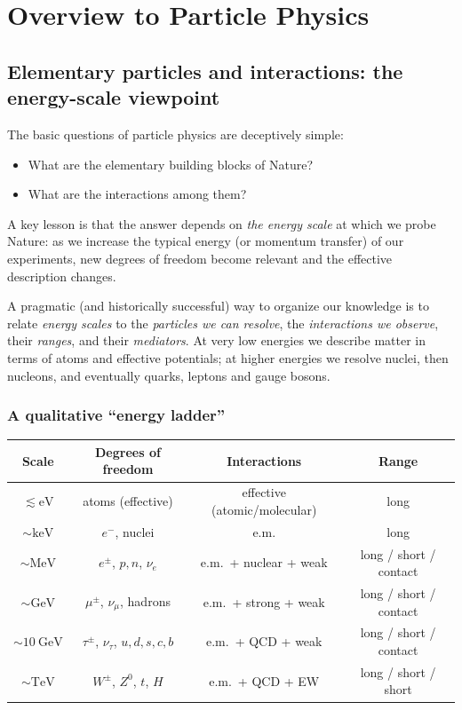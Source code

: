 \chapter{Overview to Particle Physics}

\section{Elementary particles and interactions: the energy-scale viewpoint}
The basic questions of particle physics are deceptively simple:
\begin{itemize}
  \item What are the elementary building blocks of Nature?
  \item What are the interactions among them?
\end{itemize}
A key lesson is that the answer depends on \emph{the energy scale} at which we probe Nature:
as we increase the typical energy (or momentum transfer) of our experiments, new degrees of
freedom become relevant and the effective description changes.

A pragmatic (and historically successful) way to organize our knowledge is to relate
\emph{energy scales} to the \emph{particles we can resolve}, the \emph{interactions we observe},
their \emph{ranges}, and their \emph{mediators}. At very low energies we describe matter in terms
of atoms and effective potentials; at higher energies we resolve nuclei, then nucleons,
and eventually quarks, leptons and gauge bosons.

\subsection{A qualitative ``energy ladder''}
\begin{center}
\small
\setlength{\tabcolsep}{8pt}
\renewcommand{\arraystretch}{1.15}
\begin{tabular}{@{}c c c c@{}}
\toprule
\textbf{Scale} & \textbf{Degrees of freedom} & \textbf{Interactions} & \textbf{Range} \\
\midrule
$\lesssim \mathrm{eV}$ &
atoms (effective) &
effective (atomic/molecular) &
long \\

$\sim \mathrm{keV}$ &
$e^-$, nuclei &
e.m. &
long \\

$\sim \mathrm{MeV}$ &
$e^\pm$, $p,n$, $\nu_e$ &
e.m.\ + nuclear + weak &
long / short / contact \\

$\sim \mathrm{GeV}$ &
$\mu^\pm$, $\nu_\mu$, hadrons &
e.m.\ + strong + weak &
long / short / contact \\

$\sim 10~\mathrm{GeV}$ &
$\tau^\pm$, $\nu_\tau$, $u,d,s,c,b$ &
e.m.\ + QCD + weak &
long / short / contact \\

$\sim \mathrm{TeV}$ &
$W^\pm$, $Z^0$, $t$, $H$ &
e.m.\ + QCD + EW &
long / short / short \\
\bottomrule
\end{tabular}
\end{center}



